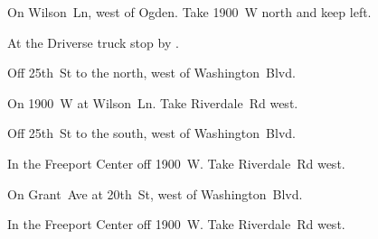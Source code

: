 
\begin{LocationList}

On Wilson~Ln, west of Ogden.
Take 1900~W north and keep left.

At the Driverse truck stop by   .

Off 25th~St to the north, west of  Washington~Blvd.

On 1900~W at Wilson~Ln.
Take  Riverdale~Rd west.

Off 25th~St to the south, west of  Washington~Blvd.

In the Freeport Center off 1900~W.
Take  Riverdale~Rd west.

On Grant~Ave at 20th~St, west of  Washington~Blvd.

In the Freeport Center off 1900~W.
Take  Riverdale~Rd west.

\end{LocationList}
